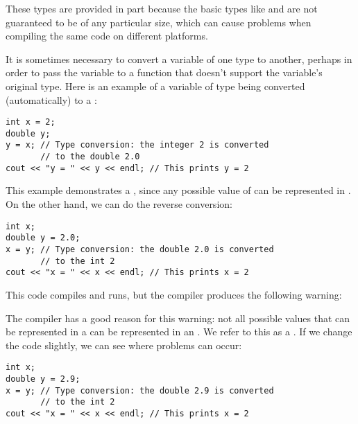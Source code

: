 These types are provided in part because the basic types like  and  are not guaranteed to be of any particular size, which can cause problems when compiling the same code on different platforms.


It is sometimes necessary to convert a variable of one type to another, perhaps in order to pass the variable to a function that doesn't support the variable's original type. 
Here is an example of a variable of type  being converted (automatically) to a :

\noindent\begin{minipage}{\linewidth}\begin{lstlisting}
int x = 2;
double y;
y = x; // Type conversion: the integer 2 is converted 
       // to the double 2.0
cout << "y = " << y << endl; // This prints y = 2
\end{lstlisting}\end{minipage}

This example demonstrates a , since any possible value of  can be represented in . 
On the other hand, we can do the reverse conversion:

\noindent\begin{minipage}{\linewidth}\begin{lstlisting}
int x;
double y = 2.0;
x = y; // Type conversion: the double 2.0 is converted 
       // to the int 2
cout << "x = " << x << endl; // This prints x = 2
\end{lstlisting}\end{minipage}

This code compiles and runs, but the compiler produces the following warning:

\noindent {}

The compiler has a good reason for this warning: not all possible values that can be represented in a  can be represented in an . 
We refer to this as a . 
If we change the code slightly, we can see where problems can occur:

\noindent\begin{minipage}{\linewidth}\begin{lstlisting}
int x;
double y = 2.9;
x = y; // Type conversion: the double 2.9 is converted 
       // to the int 2
cout << "x = " << x << endl; // This prints x = 2
\end{lstlisting}\end{minipage}

